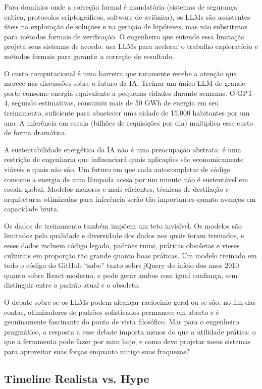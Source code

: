 Para domínios onde a correção formal é mandatória (sistemas de
segurança crítica, protocolos criptográficos, software de aviônica),
os LLMs são assistentes úteis na exploração de soluções e na geração
de hipóteses, mas não substitutos para métodos formais de verificação.
O engenheiro que entende essa limitação projeta seus sistemas de acordo:
usa LLMs para acelerar o trabalho exploratório e métodos formais para
garantir a correção do resultado.

O custo computacional é uma barreira que raramente recebe a atenção que
merece nas discussões sobre o futuro da IA. Treinar um único LLM de
grande porte consome energia equivalente a pequenas cidades durante
semanas. O GPT-4, segundo estimativas, consumiu mais de 50 GWh de
energia em seu treinamento, suficiente para abastecer uma cidade de
15.000 habitantes por um ano. A inferência em escala (bilhões de
requisições por dia) multiplica esse custo de forma dramática.

A sustentabilidade energética da IA não é uma preocupação abstrata:
é uma restrição de engenharia que influenciará quais aplicações são
economicamente viáveis e quais não são. Um futuro em que cada
autocompletar de código consome a energia de uma lâmpada acesa por
um minuto não é sustentável em escala global. Modelos menores e mais
eficientes, técnicas de destilação e arquiteturas otimizadas para
inferência serão tão importantes quanto avanços em capacidade bruta.

Os dados de treinamento também impõem um teto invisível. Os
modelos são limitados pela qualidade e diversidade dos dados nos quais
foram treinados, e esses dados incluem código legado, padrões ruins,
práticas obsoletas e vieses culturais em proporção tão grande quanto
boas práticas. Um modelo treinado em todo o código do GitHub ``sabe''
tanto sobre jQuery do início dos anos 2010 quanto sobre React moderno,
e pode gerar ambos com igual confiança, sem distinguir entre o
padrão atual e o obsoleto.

O debate sobre se os LLMs podem alcançar raciocínio geral
ou se são, no fim das contas, otimizadores de padrões sofisticados
permanece em aberto e é genuinamente fascinante do ponto de vista
filosófico. Mas para o engenheiro pragmático, a resposta a esse debate
importa menos do que a utilidade prática: o que a ferramenta pode fazer
por mim hoje, e como devo projetar meus sistemas para aproveitar suas
forças enquanto mitigo suas fraquezas?

\subsection{Timeline Realista vs. Hype}

